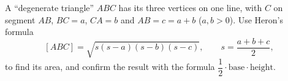 A ``degenerate triangle'' $ABC$ has its three vertices on one line, with $C$ on segment $AB$, $BC=a$, $CA=b$ and $AB=c=a+b$ ($a,b>0$). Use Heron's formula
\[
[ABC]=\sqrt{s(s-a)(s-b)(s-c)},\qquad s=\dfrac{a+b+c}{2},
\]
to find its area, and confirm the result with the formula $\dfrac{1}{2}\cdot\text{base}\cdot\text{height}$.
